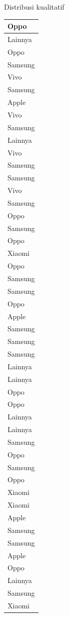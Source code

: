 \documentclass[
  ignorenonframetext,
]{beamer}
\begin{document}
\begin{frame}[s]{Distribusi kualitatif}
\begin{table}
\begin{tabular}[t]{l}
\hline
Oppo\\
\hline
Lainnya\\
\hline
Oppo\\
\hline
Samsung\\
\hline
Vivo\\
\hline
Samsung\\
\hline
Apple\\
\hline
Vivo\\
\hline
Samsung\\
\hline
Lainnya\\
\hline
Vivo\\
\hline
Samsung\\
\hline
Samsung\\
\hline
Vivo\\
\hline
Samsung\\
\hline
Oppo\\
\hline
Samsung\\
\hline
Oppo\\
\hline
Xiaomi\\
\hline
Oppo\\
\hline
Samsung\\
\hline
Samsung\\
\hline
Oppo\\
\hline
Apple\\
\hline
Samsung\\
\hline
Samsung\\
\hline
Samsung\\
\hline
Lainnya\\
\hline
Lainnya\\
\hline
Oppo\\
\hline
Oppo\\
\hline
Lainnya\\
\hline
Lainnya\\
\hline
Samsung\\
\hline
Oppo\\
\hline
Samsung\\
\hline
Oppo\\
\hline
Xiaomi\\
\hline
Xiaomi\\
\hline
Apple\\
\hline
Samsung\\
\hline
Samsung\\
\hline
Apple\\
\hline
Oppo\\
\hline
Lainnya\\
\hline
Samsung\\
\hline
Xiaomi\\

\end{tabular}
\end{table}
\end{frame}
\end{document}
